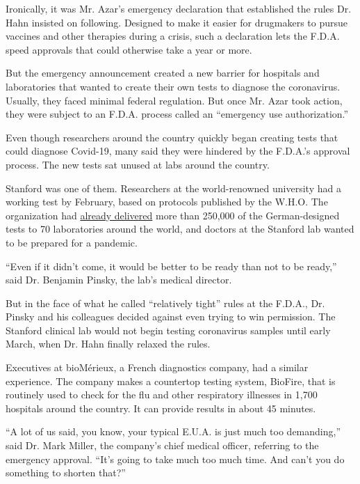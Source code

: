 Ironically, it was Mr. Azar's emergency declaration that established the
rules Dr. Hahn insisted on following. Designed to make it easier for
drugmakers to pursue vaccines and other therapies during a crisis, such
a declaration lets the F.D.A. speed approvals that could otherwise take
a year or more.

But the emergency announcement created a new barrier for hospitals and
laboratories that wanted to create their own tests to diagnose the
coronavirus. Usually, they faced minimal federal regulation. But once
Mr. Azar took action, they were subject to an F.D.A. process called an
``emergency use authorization.''

Even though researchers around the country quickly began creating tests
that could diagnose Covid-19, many said they were hindered by the
F.D.A.'s approval process. The new tests sat unused at labs around the
country.

Stanford was one of them. Researchers at the world-renowned university
had a working test by February, based on protocols published by the
W.H.O. The organization had
\href{https://www.who.int/dg/speeches/detail/who-director-general-s-opening-remarks-at-the-media-briefing-on-2019-novel-coronavirus}{already
delivered} more than 250,000 of the German-designed tests to 70
laboratories around the world, and doctors at the Stanford lab wanted to
be prepared for a pandemic.

``Even if it didn't come, it would be better to be ready than not to be
ready,'' said Dr. Benjamin Pinsky, the lab's medical director.

But in the face of what he called ``relatively tight'' rules at the
F.D.A., Dr. Pinsky and his colleagues decided against even trying to win
permission. The Stanford clinical lab would not begin testing
coronavirus samples until early March, when Dr. Hahn finally relaxed the
rules.

Executives at bioMérieux, a French diagnostics company, had a similar
experience. The company makes a countertop testing system, BioFire, that
is routinely used to check for the flu and other respiratory illnesses
in 1,700 hospitals around the country. It can provide results in about
45 minutes.

``A lot of us said, you know, your typical E.U.A. is just much too
demanding,'' said Dr. Mark Miller, the company's chief medical officer,
referring to the emergency approval. ``It's going to take much too much
time. And can't you do something to shorten that?''


